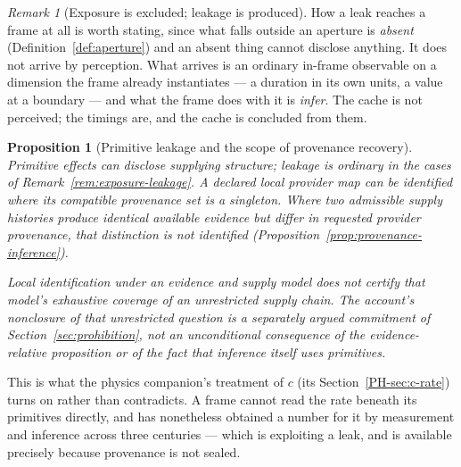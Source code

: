 \documentclass[11pt,a4paper]{article}
\newtheorem{proposition}[definition]{Proposition}
\theoremstyle{remark}\newtheorem{remark}[definition]{Remark}
\begin{document}
\begin{remark}[Exposure is excluded; leakage is produced]
How a leak reaches a frame at all is worth stating, since what falls outside an aperture is
\emph{absent} (Definition~\ref{def:aperture}) and an absent thing cannot disclose anything. It does
not arrive by perception. What arrives is an ordinary in-frame observable on a dimension the frame
already instantiates --- a duration in its own units, a value at a boundary --- and what the frame
does with it is \emph{infer}. The cache is not perceived; the timings are, and the cache is concluded
from them.
\end{remark}

\begin{proposition}[Primitive leakage and the scope of provenance recovery]\label{prop:leak}
Primitive effects can disclose supplying structure; leakage is ordinary in
the cases of Remark~\ref{rem:exposure-leakage}. A declared local provider map
can be identified where its compatible provenance set is a singleton.
Where two admissible supply histories produce identical available evidence
but differ in requested provider provenance, that distinction is not
identified (Proposition~\ref{prop:provenance-inference}).

Local identification under an evidence and supply model does not certify
that model's exhaustive coverage of an unrestricted supply chain. The
account's nonclosure of that unrestricted question is a separately argued
commitment of Section~\ref{sec:prohibition}, not an unconditional consequence
of the evidence-relative proposition or of the fact that inference itself
uses primitives.
\end{proposition}
This is what the physics companion's treatment of $c$ (its Section~\ref{PH-sec:c-rate}) turns on rather than contradicts. A frame cannot
read the rate beneath its primitives directly, and has nonetheless obtained a number for it by
measurement and inference across three centuries --- which is exploiting a leak, and is available
precisely because provenance is not sealed.
\end{document}
